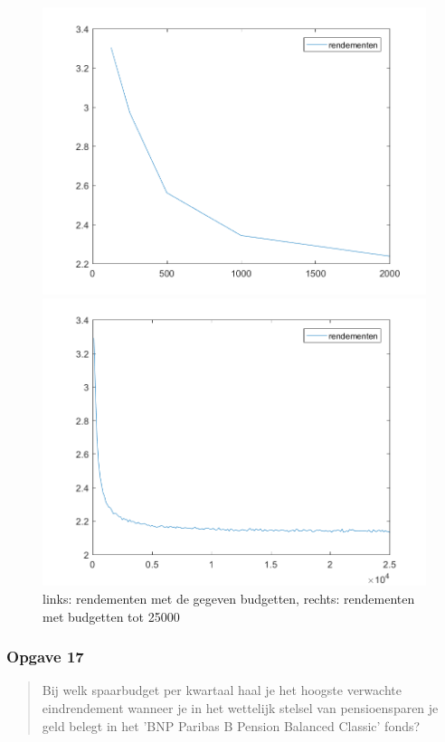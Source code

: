 \documentclass[11pt, a4paper, titlepage, openright]{article}
\begin{document}
		\begin{figure}[H]
		\begin{minipage}[b]{0.49\textwidth}
		\includegraphics[width=1.0\linewidth]{../ex16}
		\end{minipage}
		\hfill
		\begin{minipage}[b]{0.49\textwidth}
		\includegraphics[width=1\linewidth]{../ex16-veel-budgetten}
		\end{minipage}
		\caption{links: rendementen met de gegeven budgetten, rechts: rendementen met budgetten tot 25000}
		\label{fig:ex16}
		\end{figure}

	\subsubsection{Opgave 17}
		\begin{quote}
			Bij welk spaarbudget per kwartaal haal je het hoogste verwachte eindrendement wanneer je
			in het wettelijk stelsel van pensioensparen je geld belegt in het 'BNP Paribas B Pension Balanced Classic' fonds?
		\end{quote}
\end{document}
